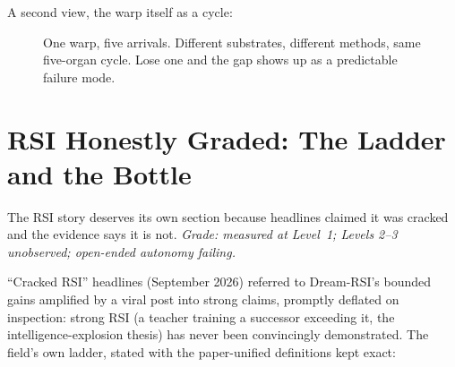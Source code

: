 A second view, the warp itself as a cycle:

\begin{figure}[h]
\centering
{}
\caption{One warp, five arrivals. Different substrates, different methods, same five-organ cycle. Lose one and the gap shows up as a predictable failure mode.}
\label{fig:ch10-five}
\end{figure}

\section{RSI Honestly Graded: The Ladder and the Bottle}
\label{sec:ch10-rsi}

The RSI story deserves its own section because headlines claimed it was cracked and the evidence says it is not. \textit{Grade: measured at Level~1; Levels 2--3 unobserved; open-ended autonomy failing.}

``Cracked RSI'' headlines (September 2026) referred to Dream-RSI's bounded gains amplified by a viral post into strong claims, promptly deflated on inspection: strong RSI (a teacher training a successor exceeding it, the intelligence-explosion thesis) has never been convincingly demonstrated. The field's own ladder, stated with the paper-unified definitions kept exact:

